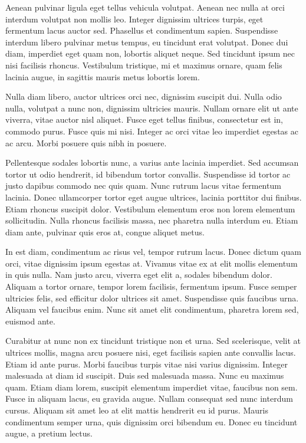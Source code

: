 \documentclass[12pt, a4paper]{article}
\begin{document}
Aenean pulvinar ligula eget tellus vehicula volutpat. Aenean nec nulla at orci interdum volutpat non mollis leo. Integer dignissim ultrices turpis, eget fermentum lacus auctor sed. Phasellus et condimentum sapien. Suspendisse interdum libero pulvinar metus tempus, eu tincidunt erat volutpat. Donec dui diam, imperdiet eget quam non, lobortis aliquet neque. Sed tincidunt ipsum nec nisi facilisis rhoncus. Vestibulum tristique, mi et maximus ornare, quam felis lacinia augue, in sagittis mauris metus lobortis lorem.

Nulla diam libero, auctor ultrices orci nec, dignissim suscipit dui. Nulla odio nulla, volutpat a nunc non, dignissim ultricies mauris. Nullam ornare elit ut ante viverra, vitae auctor nisl aliquet. Fusce eget tellus finibus, consectetur est in, commodo purus. Fusce quis mi nisi. Integer ac orci vitae leo imperdiet egestas ac ac arcu. Morbi posuere quis nibh in posuere.

Pellentesque sodales lobortis nunc, a varius ante lacinia imperdiet. Sed accumsan tortor ut odio hendrerit, id bibendum tortor convallis. Suspendisse id tortor ac justo dapibus commodo nec quis quam. Nunc rutrum lacus vitae fermentum lacinia. Donec ullamcorper tortor eget augue ultrices, lacinia porttitor dui finibus. Etiam rhoncus suscipit dolor. Vestibulum elementum eros non lorem elementum sollicitudin. Nulla rhoncus facilisis massa, nec pharetra nulla interdum eu. Etiam diam ante, pulvinar quis eros at, congue aliquet metus.

In est diam, condimentum ac risus vel, tempor rutrum lacus. Donec dictum quam orci, vitae dignissim ipsum egestas at. Vivamus vitae ex at elit mollis elementum in quis nulla. Nam justo arcu, viverra eget elit a, sodales bibendum dolor. Aliquam a tortor ornare, tempor lorem facilisis, fermentum ipsum. Fusce semper ultricies felis, sed efficitur dolor ultrices sit amet. Suspendisse quis faucibus urna. Aliquam vel faucibus enim. Nunc sit amet elit condimentum, pharetra lorem sed, euismod ante.

Curabitur at nunc non ex tincidunt tristique non et urna. Sed scelerisque, velit at ultrices mollis, magna arcu posuere nisi, eget facilisis sapien ante convallis lacus. Etiam id ante purus. Morbi faucibus turpis vitae nisi varius dignissim. Integer malesuada at diam id suscipit. Duis sed malesuada massa. Nunc eu maximus quam. Etiam diam lorem, suscipit elementum imperdiet vitae, faucibus non sem. Fusce in aliquam lacus, eu gravida augue. Nullam consequat sed nunc interdum cursus. Aliquam sit amet leo at elit mattis hendrerit eu id purus. Mauris condimentum semper urna, quis dignissim orci bibendum eu. Donec eu tincidunt augue, a pretium lectus.
\end{document}
